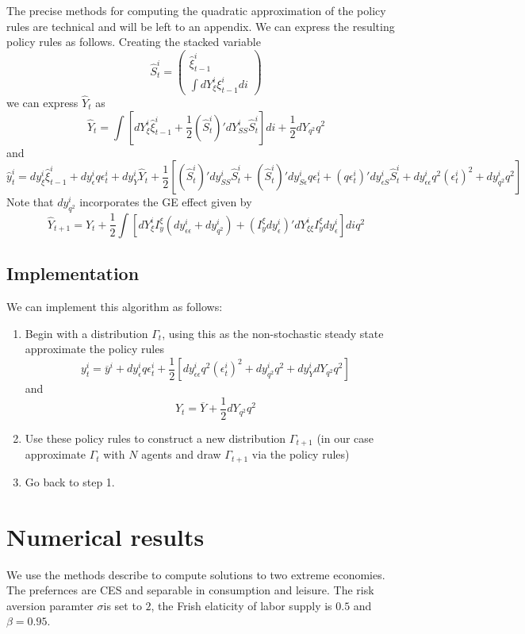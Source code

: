 \documentclass[thmsb,11pt]{article}
\newcommand{\bmat}{\begin{matrix}}
\newcommand{\emat}{\end{matrix}}
\begin{document}
The precise methods for computing the quadratic approximation of the policy rules are technical and will be left to an appendix.  We can express the resulting policy rules as follows.  Creating the stacked variable 
\[
	\hat S^i_t = \left(\bmat \hat \xi^i_{t-1}\\ \int dY^i_\xi \xi^i_{t-1}di\emat\right)
\]we can express $\hat Y_t$ as 
\begin{equation}
	\hat Y_t = \int\left[ dY^i_\xi \hat \xi^i_{t-1} + \frac12(\hat S^i_t)' dY^i_{SS}\hat S^i_t \right]di + \frac12 dY_{q^2} q^2
\end{equation} and 
\begin{equation}
	\hat y^i_t = dy^i_\xi \hat \xi^i_{t-1} + dy^i_\epsilon q\epsilon^i_t + dy^i_Y \hat Y_t  + \frac12\left[ (\hat S^i_t)' dy^i_{SS} \hat S^i_t + (\hat S^i_t)' dy^i_{S\epsilon}q\epsilon^i_t + (q\epsilon^i_t)' dy^i_{\epsilon S} \hat S^i_t + dy^i_{\epsilon\epsilon}q^2(\epsilon^i_t)^2 + dy^i_{q^2}q^2  \right]
\end{equation}  Note that  $dy^i_{q^2}$ incorporates the GE effect given by
\[
	\hat Y_{t+1} = \hat Y_t +\frac{1}{2} \int\left[ dY^i_\xi I^\xi_y(dy^i_{\epsilon\epsilon}+dy^i_{q^2}) + (I^\xi_y dy^i_\epsilon)'dY^i_{\xi\xi}I^\xi_y dy^i_\epsilon \right]di q^2
\]
\subsection{Implementation}
We can implement this algorithm as follows:
\begin{enumerate}
\item  Begin with a distribution $\Gamma_t$, using this as the non-stochastic steady state approximate the policy rules
\[
y^i_t = \overline y^i +  dy^i_\epsilon q\epsilon^i_t + \frac12\left[dy^i_{\epsilon\epsilon}q^2(\epsilon^i_t)^2 + dy^i_{q^2}q^2 + dy^i_YdY_{q^2} q^2\right]
\]and 
\[
	Y_t = \overline Y + \frac12 dY_{q^2}q^2
\]
\item  Use these policy rules to construct a new distribution $\Gamma_{t+1}$ (in our case approximate $\Gamma_t$ with $N$ agents and draw $\Gamma_{t+1}$ via the policy rules)
\item  Go back to step 1.
\end{enumerate}
  \section{Numerical results}  
We use the methods describe to compute solutions to two extreme economies. The prefernces are CES and separable in consumption and leisure. The risk aversion paramter $\sigma $is set to $2$, the Frish elaticity of labor supply is $0.5$ and $\beta=0.95$.  
\end{document}
